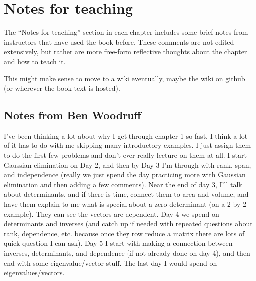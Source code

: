 \section{Notes for teaching}

The ``Notes for teaching'' section in each chapter includes some brief notes from instructors that have used the book before.  These comments are not edited extensively, but rather are more free-form reflective thoughts about the chapter and how to teach it.

This might make sense to move to a wiki eventually, maybe the wiki on github (or wherever the book text is hosted).


\subsection*{Notes from Ben Woodruff}

I've been thinking a lot about why I get through chapter 1 so fast.  I think a lot of it has to do with me skipping many introductory examples. I just assign them to do the first few problems and don't ever really lecture on them at all. I start Gaussian elimination on Day 2, and then by Day 3 I'm through with rank, span, and independence (really we just spend the day practicing more with Gaussian elimination and then adding a few comments).  Near the end of day 3, I'll talk about determinants, and if there is time, connect them to area and volume, and have them explain to me what is special about a zero determinant (on a 2 by 2 example). They can see the vectors are dependent.  Day 4 we spend on determinants and inverses (and catch up if needed with repeated questions about rank, dependence, etc. because once they row reduce a matrix there are lots of quick question I can ask).  Day 5 I start with making a connection between inverses, determinants, and dependence (if not already done on day 4), and then end with some eigenvalue/vector stuff.  The last day I would spend on eigenvalues/vectors.

